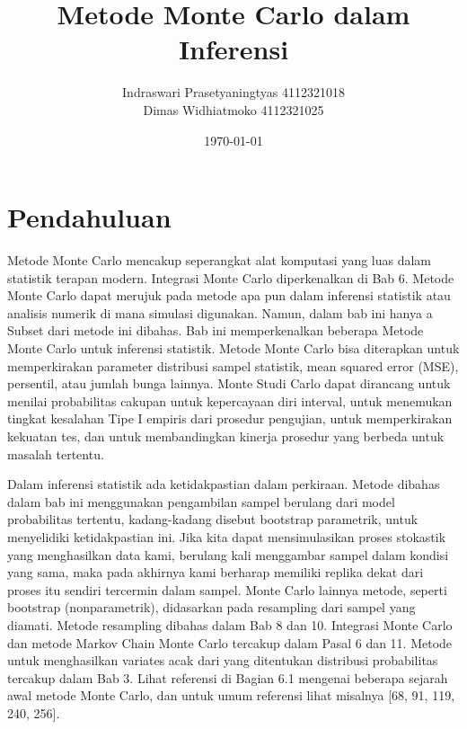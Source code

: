 \documentclass[a4paper,12pt]{article}
\theoremstyle{definition}
\begin{document}
    \title{Metode Monte Carlo dalam Inferensi}
    \author{Indraswari Prasetyaningtyas 4112321018\\
    Dimas Widhiatmoko 4112321025\\
    }
\date{\today}
\begin{titlepage}
    \maketitle
\end{titlepage}

\section{Pendahuluan}
Metode Monte Carlo mencakup seperangkat alat komputasi yang luas dalam statistik terapan modern. Integrasi Monte Carlo diperkenalkan di Bab 6. Metode Monte Carlo dapat merujuk pada metode apa pun dalam inferensi statistik atau analisis numerik di mana simulasi digunakan. Namun, dalam bab ini hanya a Subset dari metode ini dibahas. Bab ini memperkenalkan beberapa Metode Monte Carlo untuk inferensi statistik. Metode Monte Carlo bisa diterapkan untuk memperkirakan parameter distribusi sampel statistik, mean squared error (MSE), persentil, atau jumlah bunga lainnya. Monte Studi Carlo dapat dirancang untuk menilai probabilitas cakupan untuk kepercayaan diri interval, untuk menemukan tingkat kesalahan Tipe I empiris dari prosedur pengujian, untuk memperkirakan kekuatan tes, dan untuk membandingkan kinerja prosedur yang berbeda untuk masalah tertentu.

Dalam inferensi statistik ada ketidakpastian dalam perkiraan. Metode dibahas dalam bab ini menggunakan pengambilan sampel berulang dari model probabilitas tertentu, kadang-kadang disebut bootstrap parametrik, untuk menyelidiki ketidakpastian ini. Jika kita dapat mensimulasikan proses stokastik yang menghasilkan data kami, berulang kali menggambar sampel dalam kondisi yang sama, maka pada akhirnya kami berharap memiliki replika dekat dari proses itu sendiri tercermin dalam sampel. Monte Carlo lainnya metode, seperti bootstrap (nonparametrik), didasarkan pada resampling dari sampel yang diamati. Metode resampling dibahas dalam Bab 8 dan 10. Integrasi Monte Carlo dan metode Markov Chain Monte Carlo tercakup dalam Pasal 6 dan 11. Metode untuk menghasilkan variates acak dari yang ditentukan distribusi probabilitas tercakup dalam Bab 3. Lihat referensi di Bagian 6.1 mengenai beberapa sejarah awal metode Monte Carlo, dan untuk umum referensi lihat misalnya [68, 91, 119, 240, 256]. 
\end{document}
